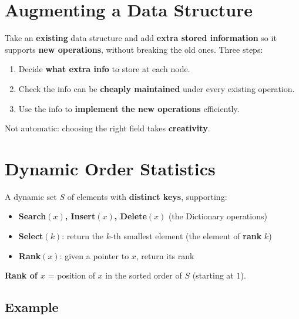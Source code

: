 \documentclass[11pt]{article}
\begin{document}
\section{Augmenting a Data Structure}

\begin{defbox}
Take an \textbf{existing} data structure and add \textbf{extra stored information} so it supports \textbf{new operations}, without breaking the old ones. Three steps:
\begin{enumerate}[leftmargin=1.4em,itemsep=1pt]
  \item Decide \textbf{what extra info} to store at each node.
  \item Check the info can be \textbf{cheaply maintained} under every existing operation.
  \item Use the info to \textbf{implement the new operations} efficiently.
\end{enumerate}
Not automatic: choosing the right field takes \textbf{creativity}.
\end{defbox}

\section{Dynamic Order Statistics}

\begin{defbox}
A dynamic set $S$ of elements with \textbf{distinct keys}, supporting:
\begin{itemize}[leftmargin=1.4em,itemsep=1pt]
  \item \textbf{Search$(x)$, Insert$(x)$, Delete$(x)$} \hfill (the Dictionary operations)
  \item \textbf{Select$(k)$}: return the \textcolor{rustW}{$k$-th smallest} element (the element of \textbf{rank} $k$)
  \item \textbf{Rank$(x)$}: given a pointer to $x$, return its \textcolor{rustW}{rank}
\end{itemize}
\textbf{Rank of $x$} = position of $x$ in the sorted order of $S$ (starting at $1$).
\end{defbox}

\subsection{Example}
\end{document}

